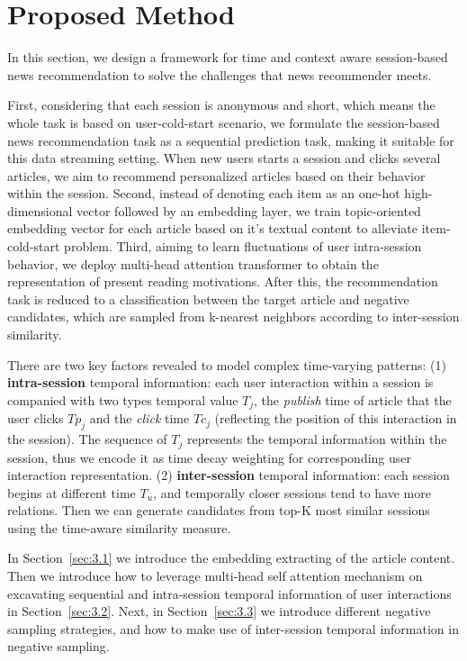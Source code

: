 \section{Proposed Method}
In this section, we design a framework for time and context aware session-based news recommendation to solve the challenges that news recommender meets. 

First, considering that each session is anonymous and short, which means the whole task is based on user-cold-start scenario, we formulate the session-based news recommendation task as a sequential prediction task, making it suitable for this data streaming setting. When new users starts a session and clicks several articles, we aim to recommend personalized articles based on their behavior within the session. Second, instead of denoting each item as an one-hot high-dimensional vector followed by an embedding layer, we train topic-oriented embedding vector for each article based on it's textual content to alleviate item-cold-start problem. Third, aiming to learn fluctuations of user intra-session behavior, we deploy multi-head attention transformer to obtain the representation of present reading motivations. After this, the recommendation task is reduced to a classification between the target article and negative candidates, which are sampled from k-nearest neighbors according to inter-session similarity.

There are two key factors revealed to model complex time-varying patterns: (1) \textbf{intra-session} temporal information: each user interaction within a session is companied with two types temporal value $T_j$, the \textit{publish} time of article that the user clicks $Tp_j$ and the \textit{click} time $Tc_j$ (reflecting the position of this interaction in the session). The sequence of $T_j$ represents the temporal information within the session, thus we encode it as time decay weighting for corresponding user interaction representation. (2) \textbf{inter-session} temporal information: each session begins at different time $T_u$, and temporally closer sessions tend to have more relations. Then we can generate candidates from top-K most similar sessions using the time-aware similarity measure.

In Section~\ref{sec:3.1} we introduce the embedding extracting of the article content. Then we introduce how to leverage multi-head self attention mechanism on excavating sequential and intra-session temporal information of user interactions in Section~\ref{sec:3.2}. Next, in Section~\ref{sec:3.3} we introduce different negative sampling strategies, and how to make use of inter-session temporal information in negative sampling.

